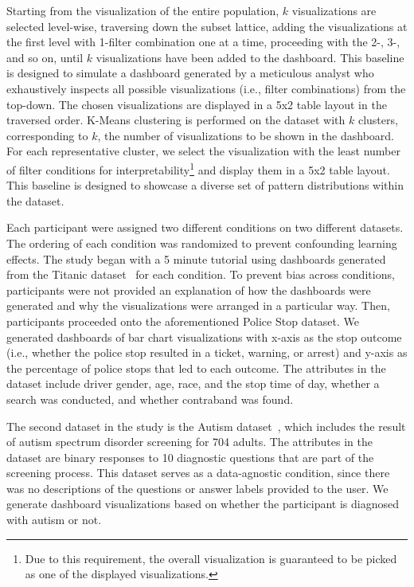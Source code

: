  Starting from the visualization of the entire population, $k$ visualizations are selected level-wise, traversing down the subset lattice, adding the visualizations at the first level with 1-filter combination one at a time, proceeding with the 2-, 3-, and so on, until $k$ visualizations have been added to the dashboard. This baseline is designed to simulate a dashboard generated by a meticulous analyst who exhaustively inspects all possible visualizations (i.e., filter combinations) from the top-down. The chosen visualizations are displayed in a 5x2 table layout in the traversed order.
\stitle{\cluster:} K-Means clustering is performed on the dataset with $k$ clusters, corresponding to $k$, the number of visualizations to be shown in the dashboard. For each representative cluster, we select the visualization with the least number of filter conditions for interpretability\footnote{Due to this requirement, the overall visualization is guaranteed to be picked as one of the displayed visualizations.} and display them in a 5x2 table layout. This baseline is designed to showcase a diverse set of pattern distributions within the dataset.
\par Each participant were assigned two different conditions on two different datasets. The ordering of each condition was randomized to prevent confounding learning effects. The study began with a 5 minute tutorial using dashboards generated from the Titanic dataset~\cite{titanic} for each condition. To prevent bias across conditions, participants were not provided an explanation of how the dashboards were generated and why the visualizations were arranged in a particular way. Then, participants proceeded onto the aforementioned Police Stop dataset. We generated dashboards of bar chart visualizations with x-axis as the stop outcome (i.e., whether the police stop resulted in a ticket, warning, or arrest) and y-axis as the percentage of police stops that led to each outcome. The attributes in the dataset include driver gender, age, race, and the stop time of day, whether a search was conducted, and whether contraband was found. %
\par The second dataset in the study is the Autism dataset~\cite{autism}, which includes the result of autism spectrum disorder screening for 704 adults. The attributes in the dataset are binary responses to 10 diagnostic questions that are part of the screening process. This dataset serves as a data-agnostic condition, since there was no descriptions of the questions or answer labels provided to the user. We generate dashboard visualizations based on whether the participant is diagnosed with autism or not. 
